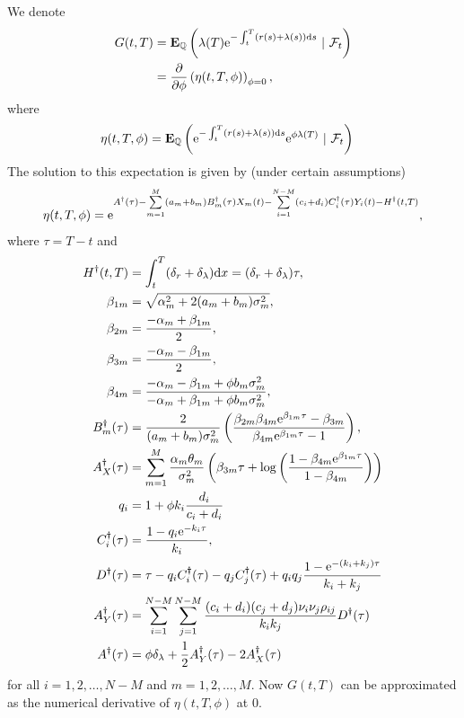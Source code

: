 We denote
	\begin{align}
		G(t,T) &= \operatorname{\boldsymbol{\mathrm{E}}}_{\mathbb{Q}} \left( \lambda(T) \mathrm{e}^{ - \int_t^T (r(s) + \lambda(s)) \mathrm{d} s } \ | \ \mathcal{F}_t \right) \\
		&= \frac{\partial}{\partial \phi} \left( \eta(t,T,\phi) \right)_{\phi=0} ,
	\end{align}
where
	\begin{align}
		\eta(t,T,\phi) &= \operatorname{\boldsymbol{\mathrm{E}}}_{\mathbb{Q}} \left( \mathrm{e}^{ - \int_t^T (r(s) + \lambda(s)) \mathrm{d} s } \mathrm{e}^{\phi \lambda(T)} \ | \ \mathcal{F}_t \right)
	\end{align}
The solution to this expectation is given by (under certain assumptions)
	\begin{align}
		\eta(t,T,\phi) = \mathrm{e}^{ A^{\dagger}(\tau) - \sum\limits_{m=1}^M(a_m+b_m)B_m^{\dagger}(\tau)X_m(t) - \sum\limits_{i=1}^{N-M} (c_i + d_i) C_i^{\dagger}(\tau) Y_i(t) - H^{\dagger}(t,T) },
	\end{align}
where $\tau = T-t$ and
\begin{align}
H^{\dagger}(t,T) &= \int_t^T (\delta_r + \delta_{\lambda}) \mathrm{d} x = (\delta_r + \delta_{\lambda}) \tau, \\
\beta_{1m} &= \sqrt{\alpha_m^2 + 2 (a_m+b_m) \sigma_m^2} , \\
\beta_{2m} &= \frac{-\alpha_m+\beta_{1m}}{2} , \\
\beta_{3m} &= \frac{-\alpha_m-\beta_{1m}}{2} , \\
\beta_{4m} &= \frac{-\alpha_m - \beta_{1m} + \phi b_m \sigma_m^2}{-\alpha_m + \beta_{1m} + \phi b_m \sigma_m^2} , \\
B_m^{\dagger}(\tau) &= \frac{ 2 }{ (a_m + b_m) \sigma_m^2 } \left( \frac{ \beta_{2m} \beta_{4m} \mathrm{e}^{\beta_{1m} \tau} - \beta_{3m} }{ \beta_{4m} \mathrm{e}^{\beta_{1m} \tau} - 1 } \right), \\
A_X^{\dagger}(\tau) &= \sum_{m=1}^M \frac{\alpha_m \theta_m}{\sigma_m^2} \left( \beta_{3m} \tau + \log \left( \frac{ 1-\beta_{4m}\mathrm{e}^{ \beta_{1m} \tau }  }{1-\beta_{4m}} \right) \right) \\
q_i &= 1 + \phi k_i \frac{d_i}{c_i + d_i} \\
C_i^{\dagger}(\tau) &= \frac{1 - q_i\mathrm{e}^{-k_i \tau}}{k_i}, \\
D^{\dagger} (\tau) &= \tau - q_i C_i^{\dagger}(\tau) - q_j C_j^{\dagger}(\tau) + q_iq_j \frac{ 1 - \mathrm{e}^{ - (k_i + k_j) \tau} }{k_i + k_j} \\
A_Y^{\dagger}(\tau) &= \sum_{i=1}^{N-M} \sum_{j=1}^{N-M} 
	\frac{ (c_i+d_i)(c_j+d_j) \nu_i \nu_j \rho_{ij} }{ k_i k_j }
	 D^{\dagger} (\tau) \\
A^{\dagger}(\tau) &= \phi \delta_{\lambda} + \frac{1}{2}A_Y^{\dagger}(\tau) - 2 A_X^{\dagger}(\tau)
\end{align}
for all $i = 1,2, \ldots, N-M$ and $m=1,2, \ldots, M$. Now $G(t,T)$ can be approximated as the numerical derivative of $\eta(t,T,\phi)$ at $0$.


